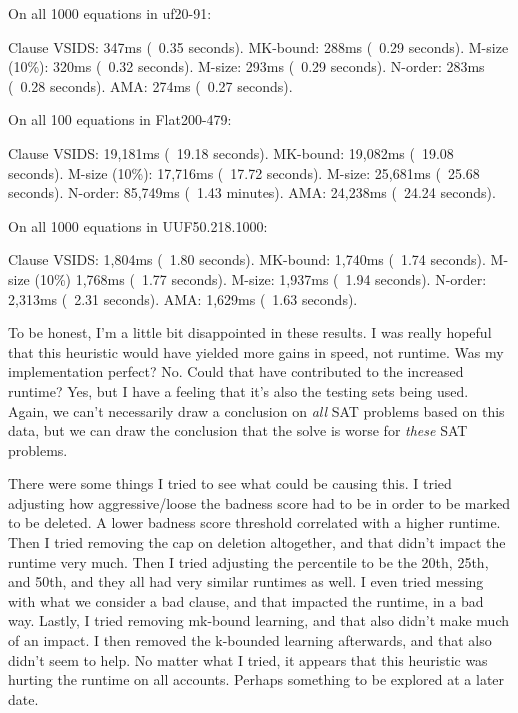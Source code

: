 \begin{FVerbatim}
On all 1000 equations in uf20-91:

Clause VSIDS:   347ms (~0.35 seconds).
MK-bound:       288ms (~0.29 seconds).
M-size (10\%):  320ms (~0.32 seconds).
M-size:         293ms (~0.29 seconds).
N-order:        283ms (~0.28 seconds).
AMA:            274ms (~0.27 seconds).

On all 100 equations in Flat200-479:

Clause VSIDS:   19,181ms (~19.18 seconds).
MK-bound:       19,082ms (~19.08 seconds).
M-size (10\%):  17,716ms (~17.72 seconds).
M-size:         25,681ms (~25.68 seconds).
N-order:        85,749ms (~1.43 minutes).
AMA:            24,238ms (~24.24 seconds).

On all 1000 equations in UUF50.218.1000:

Clause VSIDS:   1,804ms (~1.80 seconds).
MK-bound:       1,740ms (~1.74 seconds).
M-size (10\%)   1,768ms (~1.77 seconds).
M-size:         1,937ms (~1.94 seconds).
N-order:        2,313ms (~2.31 seconds).
AMA:            1,629ms (~1.63 seconds).
\end{FVerbatim}
\noindent
To be honest, I'm a little bit disappointed in these results. I was really hopeful 
that this heuristic would have yielded more gains in speed, not runtime. Was my 
implementation perfect? No. Could that have contributed to the increased runtime?
Yes, but I have a feeling that it's also the testing sets being used. Again, we 
can't necessarily draw a conclusion on \textit{all} SAT problems based on this 
data, but we can draw the conclusion that the solve is worse for \textit{these}
SAT problems.

There were some things I tried to see what could be causing this. I tried adjusting 
how aggressive/loose the badness score had to be in order to be marked to be deleted. 
A lower badness score threshold correlated with a higher runtime. Then I tried removing 
the cap on deletion altogether, and that didn't impact the runtime very much. Then I tried 
adjusting the percentile to be the 20th, 25th, and 50th, and they all had very similar runtimes 
as well. I even tried messing with what we consider a bad clause, and that impacted 
the runtime, in a bad way. Lastly, I tried removing mk-bound learning, and that also didn't 
make much of an impact. I then removed the k-bounded learning afterwards, and that also didn't 
seem to help. No matter what I tried, it appears that this heuristic was hurting the runtime 
on all accounts. Perhaps something to be explored at a later date.

